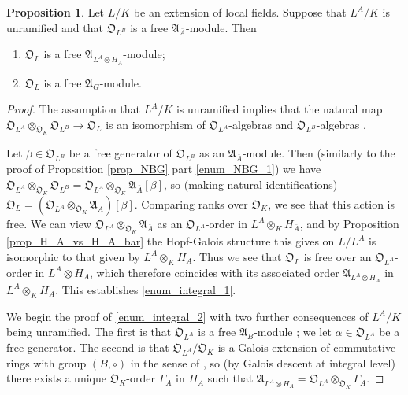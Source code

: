 \documentclass[12pt,a4paper, reqno]{amsart}
\theoremstyle{definition}
\newtheorem{proposition}[theorem]{Proposition}
\def \O {\mathfrak{O}}
\def \A {\mathfrak{A}}
\begin{document}
\begin{proposition}
Let $ L/K $ be an extension of local fields. Suppose that $ L^{A}/K $ is unramified and that $ \O_{L^{B}} $ is a free $ \A_{\overline{A}} $-module. Then
\begin{enumerate}
\item $ \O_{L} $ is a free $ \A_{L^{A} \otimes H_{A}} $-module; \label{enum_integral_1}
\item $ \O_{L} $ is a free $ \A_{G} $-module.
\label{enum_integral_2}
\end{enumerate}
\end{proposition}
\begin{proof}
The assumption that $ L^{A}/K $ is unramified implies that the natural map $ \O_{L^{A}} \otimes_{\O_{K}} \O_{L^{B}} \rightarrow \O_{L} $ is an isomorphism of $ \O_{L^{A}} $-algebras and $ \O_{L^{B}} $-algebras \cite[(2.13)]{FT91}. 

Let $ \beta \in \O_{L^{B}} $ be a free generator of $ \O_{L^{B}} $ as an $ \A_{\overline{A}} $-module. Then (similarly to the proof of Proposition \ref{prop_NBG} part \ref{enum_NBG_1}) we have $ \O_{L^{A}} \otimes_{\O_{K}} \O_{L^{B}} = \O_{L^{A}} \otimes_{\O_{K}} \A_{\overline{A}} [\beta] $, so (making natural identifications) $ \O_{L} = (\O_{L^{A}} \otimes_{\O_{K}} \A_{\overline{A}}) [\beta] $. Comparing ranks over $ \O_{K} $, we see that this action is free. We can view $ \O_{L^{A}} \otimes_{\O_{K}} \A_{\overline{A}} $ as an $ \O_{L^{A}} $-order in $ L^{A} \otimes_{K} H_{\overline{A}} $, and by Proposition \ref{prop_H_A_vs_H_A_bar} the Hopf-Galois structure this gives on $ L/L^{A} $ is isomorphic to that given by $ L^{A} \otimes_{K} H_{A} $. Thus we see that $ \O_{L} $ is free over an $ \O_{L^{A}} $-order in $ L^{A} \otimes H_{A} $, which therefore coincides with its associated order $ \A_{L^{A} \otimes H_{A}} $ in $ L^{A} \otimes_{K} H_{A} $. This establishes \ref{enum_integral_1}. 

We begin the proof of \ref{enum_integral_2} with two further consequences of $ L^{A}/K $ being unramified. The first is that $ \O_{L^{A}} $ is a free $ \A_{B} $-module \cite[Theorem 3.4]{Tr11}; we let $ \alpha \in \O_{L^{A}} $ be a free generator. The second is that $ \O_{L^{A}} / \O_{K} $ is a Galois extension of commutative rings with group $ (B,\circ) $ in the sense of \cite{CHR65}, so (by Galois descent at integral level) there exists a unique $ \O_{K} $-order $ \Gamma_{A} $ in $ H_{A} $ such that $ \A_{L^{A} \otimes H_{A}} = \O_{L^{A}} \otimes_{\O_{K}} \Gamma_{A} $. 


\end{proof}
\end{document}
